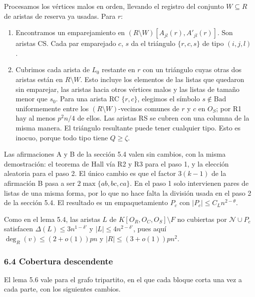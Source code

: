 \documentclass[spanish,11pt,a4paper]{article}
\providecommand{\tightlist}{\setlength{\itemsep}{0pt}\setlength{\parskip}{0pt}}
\begin{document}
Procesamos los vértices malos en orden, llevando el registro del conjunto \(W\subseteq R\) de aristas de reserva ya usadas. Para \(r\):

\begin{enumerate}
\def\labelenumi{\arabic{enumi}.}
\tightlist
\item
  Encontramos un emparejamiento en \((R\setminus W)[A_{jl}(r),A'_{jl}(r)]\). Son aristas CS. Cada par emparejado \(c\), \(s\) da el triángulo \(\{r,c,s\}\) de tipo \((i,j,l)\).
\item
  Cubrimos cada arista de \(L_0\) restante en \(r\) con un triángulo cuyas otras dos aristas están en \(R\setminus W\). Esto incluye los elementos de las listas que quedaron sin emparejar, las aristas hacia otros vértices malos y las listas de tamaño menor que \(s_0\). Para una arista RC \(\{r,c\}\), elegimos el símbolo \(s\notin\mathrm{Bad}\) uniformemente entre los \((R\setminus W)\)-vecinos comunes de \(r\) y \(c\) en \(O_S\); por R1 hay al menos \(p^2n/4\) de ellos. Las aristas RS se cubren con una columna de la misma manera. El triángulo resultante puede tener cualquier tipo. Esto es inocuo, porque todo tipo tiene \(Q\ge\zeta\).
\end{enumerate}

Las afirmaciones A y B de la sección 5.4 valen sin cambios, con la misma demostración: el teorema de Hall vía R2 y R3 para el paso 1, y la elección aleatoria para el paso 2. El único cambio es que el factor \(3(k-1)\) de la afirmación B pasa a ser \(2\max\{ab,bc,ca\}\). En el paso 1 solo intervienen pares de listas de una misma forma, por lo que no hace falta la división usada en el paso 2 de la sección 5.4. El resultado es un empaquetamiento \(P_c\) con \(|P_c|\le C_Ln^{2-\theta}\).

Como en el lema 5.4, las aristas \(L\) de \(K[O_R,O_C,O_S]\setminus F\) no cubiertas por \(\mathcal N\cup P_c\) satisfacen \(\Delta(L)\le3n^{1-\delta'}\) y \(|L|\le4n^{2-\delta'}\), pues aquí \(\deg_R(v)\le(2+o(1))pn\) y \(|R|\le(3+o(1))pn^2\).

\subsubsection{6.4 Cobertura descendente}\label{cobertura-descendente-1}

El lema 5.6 vale para el grafo tripartito, en el que cada bloque corta una vez a cada parte, con los siguientes cambios.
\end{document}
